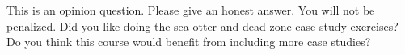 \bonusquestion[1]
This is an opinion question. Please give an honest answer. You will not be penalized. Did you like doing the sea otter and dead zone case study exercises? Do you think this course would benefit from including more case studies?

\AnswerBox{2\basespace}{\ }